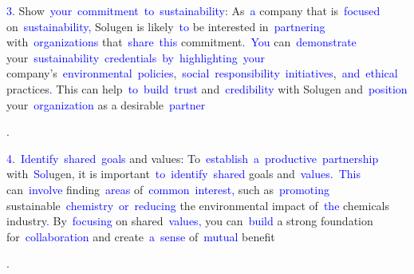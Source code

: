 \documentclass{article}
\begin{document}
\begin{tcolorbox}[colframe=black,colback=white]
{}\textcolor{blue}{3}. Show\textcolor{blue}{~your}\textcolor{blue}{~commitment}\textcolor{blue}{~to}\textcolor{blue}{~sustainability}: As\textcolor{blue}{~a} company that is\textcolor{blue}{~focused} on\textcolor{blue}{~sustainability}\textcolor{blue}{,} Solugen is likely\textcolor{blue}{~to} be interested in\textcolor{blue}{~partnering} with\textcolor{blue}{~organizations} that\textcolor{blue}{~share}\textcolor{blue}{~this} commitment\textcolor{blue}{.}\textcolor{blue}{~You} can\textcolor{blue}{~demonstrate} your\textcolor{blue}{~sustainability}\textcolor{blue}{~credentials}\textcolor{blue}{~by}\textcolor{blue}{~highlighting}\textcolor{blue}{~your} company's\textcolor{blue}{~environmental}\textcolor{blue}{~policies},\textcolor{blue}{~social}\textcolor{blue}{~responsibility}\textcolor{blue}{~initiatives},\textcolor{blue}{~and}\textcolor{blue}{~ethical} practices\textcolor{blue}{.} This can help\textcolor{blue}{~to}\textcolor{blue}{~build}\textcolor{blue}{~trust} and\textcolor{blue}{~credibility} with Solugen and\textcolor{blue}{~position} your\textcolor{blue}{~organization} as a desirable\textcolor{blue}{~partner}\textcolor{blue}{.

}\textcolor{blue}{4}.\textcolor{blue}{~Identify}\textcolor{blue}{~shared}\textcolor{blue}{~goals} and values\textcolor{blue}{:} To\textcolor{blue}{~establish}\textcolor{blue}{~a}\textcolor{blue}{~productive}\textcolor{blue}{~partnership} with\textcolor{blue}{~Sol}ugen, it is important\textcolor{blue}{~to}\textcolor{blue}{~identify}\textcolor{blue}{~shared} goals and\textcolor{blue}{~values}\textcolor{blue}{.}\textcolor{blue}{~This} can\textcolor{blue}{~involve} finding\textcolor{blue}{~areas} of\textcolor{blue}{~common}\textcolor{blue}{~interest}\textcolor{blue}{,} such as\textcolor{blue}{~promoting} sustainable\textcolor{blue}{~chemistry}\textcolor{blue}{~or}\textcolor{blue}{~reducing} the environmental impact of\textcolor{blue}{~the} chemicals industry\textcolor{blue}{.} By\textcolor{blue}{~focusing} on shared\textcolor{blue}{~values}\textcolor{blue}{,} you can\textcolor{blue}{~build} a strong foundation for\textcolor{blue}{~collaboration} and create\textcolor{blue}{~a}\textcolor{blue}{~sense} of\textcolor{blue}{~mutual} benefit\textcolor{blue}{.

}
\end{tcolorbox}
\end{document}

